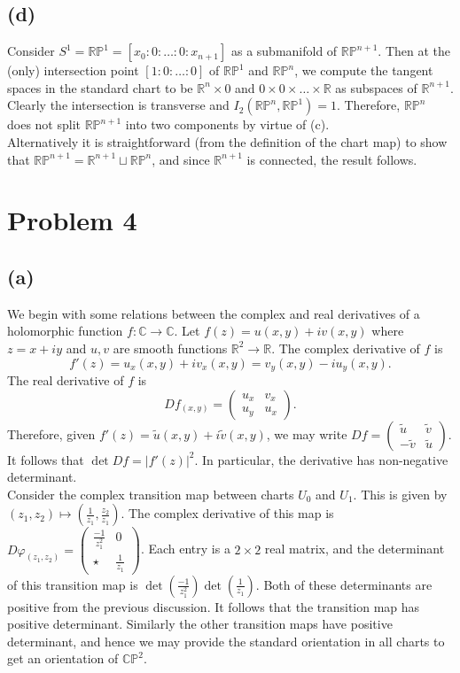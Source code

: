 \documentclass{amsbook}
\theoremstyle{theorem}
\theoremstyle{plain}
\theoremstyle{remark}
\newcommand{\R}{\mathbb R}
\newcommand{\C}{\mathbb C}
\renewcommand{\P}{\mathbb P}
\begin{document}
\section*{(d)}

Consider $S^1 = \R\P^1 = [x_0:0:\dots:0:x_{n+1}]$ as a submanifold of $\R\P^{n+1}$. Then at the (only) intersection point $[1:0:\dots:0]$ of $\R\P^1$ and $\R\P^n$, we compute the tangent spaces in the standard chart to be $\R^n \times 0$ and $0\times 0 \times \dots \times \R$ as subspaces of $\R^{n+1}$. Clearly the intersection is transverse and $I_2(\R\P^n, \R\P^1) = 1$. Therefore, $\R\P^n$ does not split $\R\P^{n+1}$ into two components by virtue of (c). \\

Alternatively it is straightforward (from the definition of the chart map) to show that $\R\P^{n+1} = \R^{n+1} \sqcup \R\P^n$, and since $\R^{n+1}$ is connected, the result follows.
\chapter*{Problem 4}

\section*{(a)}

We begin with some relations between the complex and real derivatives of a holomorphic function $f: \C \to \C$. Let $f(z) = u(x,y) + iv(x,y)$ where $z=x+iy$ and $u,v$ are smooth functions $\R^2 \to \R$. The complex derivative of $f$ is \[f'(z) = u_x(x,y) + iv_x(x,y) =v_y(x,y) - i u_y(x,y).\] The real derivative of $f$ is \[Df_{(x,y)} =
  \begin{pmatrix}
    u_x & v_x \\ u_y & u_x
  \end{pmatrix}.\] Therefore, given $f'(z) = \tilde u(x,y)+ i\tilde v(x,y)$, we may write $Df =
\begin{pmatrix}
  \tilde u & \tilde v\\
  -\tilde v & \tilde u
\end{pmatrix}$. It follows that $\det Df = |f'(z)|^2$. In particular, the derivative has non-negative determinant.\\

Consider the complex transition map between charts $U_0$ and $U_1$. This is given by $(z_1, z_2) \mapsto (\frac 1{z_1}, \frac{z_2}{z_1})$. The complex derivative of this map is $ D\varphi_{(z_1, z_2)} = 
\begin{pmatrix}
  \frac{-1}{z_1^2} & 0 \\
  \star & \frac{1}{z_1}
\end{pmatrix}$. Each entry is a $2\times 2$ real matrix, and the determinant of this transition map is $\det (\frac{-1}{z_1^2}) \det (\frac{1}{z_1})$. Both of these determinants are positive from the previous discussion. It follows that the transition map has positive determinant. Similarly the other transition maps have positive determinant, and hence we may provide the standard orientation in all charts to get an orientation of $\C\P^2$. 
\end{document}
